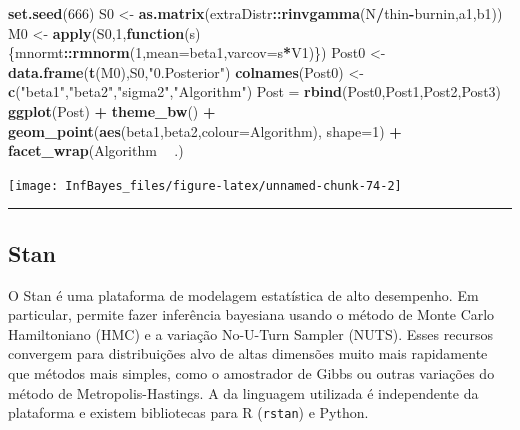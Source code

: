 \documentclass[
]{book}
\newenvironment{Shaded}{\begin{snugshade}}{\end{snugshade}}
\newcommand{\ControlFlowTok}[1]{\textcolor[rgb]{0.13,0.29,0.53}{\textbf{#1}}}
\newcommand{\DataTypeTok}[1]{\textcolor[rgb]{0.13,0.29,0.53}{#1}}
\newcommand{\DecValTok}[1]{\textcolor[rgb]{0.00,0.00,0.81}{#1}}
\newcommand{\KeywordTok}[1]{\textcolor[rgb]{0.13,0.29,0.53}{\textbf{#1}}}
\newcommand{\NormalTok}[1]{#1}
\newcommand{\OperatorTok}[1]{\textcolor[rgb]{0.81,0.36,0.00}{\textbf{#1}}}
\newcommand{\StringTok}[1]{\textcolor[rgb]{0.31,0.60,0.02}{#1}}
\begin{document}
\begin{Shaded}
\begin{Highlighting}[]
\KeywordTok{set.seed}\NormalTok{(}\DecValTok{666}\NormalTok{)}
\NormalTok{S0 <-}\StringTok{ }\KeywordTok{as.matrix}\NormalTok{(extraDistr}\OperatorTok{::}\KeywordTok{rinvgamma}\NormalTok{(N}\OperatorTok{/}\NormalTok{thin}\OperatorTok{-}\NormalTok{burnin,a1,b1))}
\NormalTok{M0 <-}\StringTok{ }\KeywordTok{apply}\NormalTok{(S0,}\DecValTok{1}\NormalTok{,}\ControlFlowTok{function}\NormalTok{(s)\{mnormt}\OperatorTok{::}\KeywordTok{rmnorm}\NormalTok{(}\DecValTok{1}\NormalTok{,}\DataTypeTok{mean=}\NormalTok{beta1,}\DataTypeTok{varcov=}\NormalTok{s}\OperatorTok{*}\NormalTok{V1)\})}
\NormalTok{Post0 <-}\StringTok{ }\KeywordTok{data.frame}\NormalTok{(}\KeywordTok{t}\NormalTok{(M0),S0,}\StringTok{"0.Posterior"}\NormalTok{)}
\KeywordTok{colnames}\NormalTok{(Post0) <-}\StringTok{ }\KeywordTok{c}\NormalTok{(}\StringTok{"beta1"}\NormalTok{,}\StringTok{"beta2"}\NormalTok{,}\StringTok{"sigma2"}\NormalTok{,}\StringTok{"Algorithm"}\NormalTok{)}
\NormalTok{Post =}\StringTok{ }\KeywordTok{rbind}\NormalTok{(Post0,Post1,Post2,Post3)}
\KeywordTok{ggplot}\NormalTok{(Post) }\OperatorTok{+}\StringTok{ }\KeywordTok{theme_bw}\NormalTok{() }\OperatorTok{+}
\StringTok{  }\KeywordTok{geom_point}\NormalTok{(}\KeywordTok{aes}\NormalTok{(beta1,beta2,}\DataTypeTok{colour=}\NormalTok{Algorithm), }\DataTypeTok{shape=}\DecValTok{1}\NormalTok{) }\OperatorTok{+}
\StringTok{  }\KeywordTok{facet_wrap}\NormalTok{(Algorithm }\OperatorTok{~}\StringTok{ }\NormalTok{.)}
\end{Highlighting}
\end{Shaded}

\begin{center}\texttt{[image: InfBayes\_files/figure-latex/unnamed-chunk-74-2]} \end{center}

\begin{center}\rule{0.5\linewidth}{0.5pt}\end{center}

\hypertarget{stan}{%
\subsection{Stan}\label{stan}}

O Stan é uma plataforma de modelagem estatística de alto desempenho. Em particular, permite fazer inferência bayesiana usando o método de Monte Carlo Hamiltoniano (HMC) e a variação No-U-Turn Sampler (NUTS). Esses recursos convergem para distribuições alvo de altas dimensões muito mais rapidamente que métodos mais simples, como o amostrador de Gibbs ou outras variações do método de Metropolis-Hastings. A da linguagem utilizada é independente da plataforma e existem bibliotecas para R (\texttt{rstan}) e Python.
\end{document}
